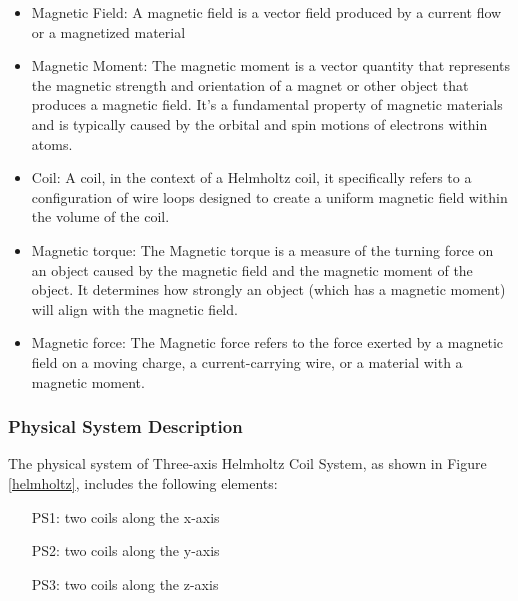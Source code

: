 \documentclass[12pt]{article}
\begin{document}
\begin{itemize}

\item Magnetic Field: A magnetic field is a vector field produced by a current flow or a magnetized material

\item Magnetic Moment: The magnetic moment is a vector quantity that represents the magnetic strength and orientation of a magnet or other object that produces a magnetic field. It's a fundamental property of magnetic materials and is typically caused by the orbital and spin motions of electrons within atoms.

\item Coil: A coil, in the context of a Helmholtz coil, it specifically refers to a configuration of wire loops designed to create a uniform magnetic field within the volume of the coil.
\item Magnetic torque: The Magnetic torque is a measure of the turning force on an object caused by the magnetic field and the magnetic moment of the object. It determines how strongly an object (which has a magnetic moment) will align with the magnetic field.
\item Magnetic force: The Magnetic force refers to the force exerted by a magnetic field on a moving charge, a current-carrying wire, or a material with a magnetic moment.
\end{itemize}

\subsubsection{Physical System Description} \label{sec_phySystDescrip}

The physical system of Three-axis Helmholtz Coil System, as shown in Figure \ref{helmholtz},
includes the following elements:

\begin{itemize}

\item[PS1:]  two coils along the x-axis

\item[PS2:]  two coils along the y-axis

\item[PS3:]  two coils along the z-axis


\end{itemize}
\end{document}
